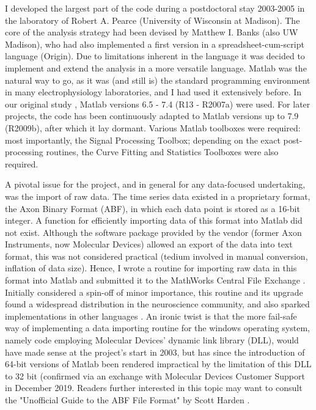 I developed the largest part of the code during a postdoctoral stay 2003-2005 in the laboratory of Robert A. Pearce (University of Wisconsin at Madison). The core of the analysis strategy had been devised by Matthew I. Banks (also UW Madison), who had also implemented a first version in a spreadsheet-cum-script language (Origin). Due to limitations inherent in the language it was decided to implement and extend the analysis in a more versatile language. Matlab was the natural way to go, as it was (and still is) the standard programming environment in many electrophysiology laboratories, and I had used it extensively before. In our original study \cite{hentschke_muscarinic_2007}, Matlab versions 6.5 - 7.4 (R13 - R2007a) were used. For later projects, the code has been continuously adapted to Matlab versions up to 7.9 (R2009b), after which it lay dormant. Various Matlab toolboxes were required: most importantly, the Signal Processing Toolbox; depending on the exact post-processing routines, the Curve Fitting and Statistics Toolboxes were also required. 

A pivotal issue for the project, and in general for any data-focused undertaking, was the import of raw data. The time series data existed in a proprietary format, the Axon Binary Format (ABF), in which each data point is stored as a 16-bit integer. A function for efficiently importing data of this format into Matlab did not exist. Although the software package provided by the vendor (former Axon Instruments, now Molecular Devices) allowed an export of the data into text format, this was not considered practical (tedium involved in manual conversion, inflation of data size). Hence, I wrote a routine for importing raw data in this format into Matlab and submitted it to the MathWorks Central File Exchange \cite{hentschke_abfload_nodate}. Initially considered a spin-off of minor importance, this routine and its upgrade \cite{collman_fcollmanabfload_nodate} found a widespread distribution in the neuroscience community, and also sparked implementations in other languages \cite{caldwell_abfload_nodate, harden_swhardenpyabf_nodate}. An ironic twist is that the more fail-safe way of implementing a data importing routine for the windows operating system, namely code employing Molecular Devices' dynamic link library (DLL), would have made sense at the project's start in 2003, but has since the introduction of 64-bit versions of Matlab been rendered impractical by the limitation of this DLL to 32 bit (confirmed via an exchange with Molecular Devices Customer Support in December 2019. Readers further interested in this topic may want to consult the "Unofficial Guide to the ABF File Format" by Scott Harden \cite{harden_scott_w_unofficial_nodate}.

